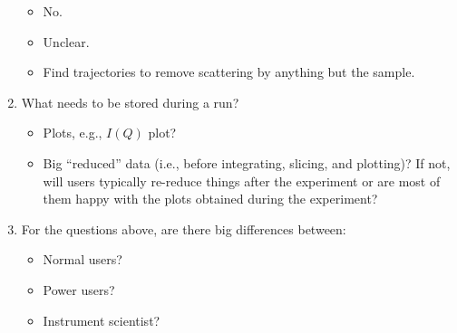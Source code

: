 \documentclass[a4paper,english,numbers=noenddot,bibliography=totoc,chapterprefix=on,DIV=12]{scrartcl}
\begin{document}
\begin{enumerate}
{    \begin{itemize}
      \item No.
      \item Unclear.
      \item Find trajectories to remove scattering by anything but the sample.
    \end{itemize}
  }
  \item What needs to be stored during a run?
    \begin{itemize}
      \item Plots, e.g., $I(Q)$ plot?
      \item Big ``reduced'' data (i.e., before integrating, slicing, and plotting)?
        {\color{black!60}
        If not, will users typically re-reduce things after the experiment or are most of them happy with the plots obtained during the experiment?
        }
    \end{itemize}
  \item For the questions above, are there big differences between:
    \begin{itemize}
      \item Normal users?
      \item Power users?
      \item Instrument scientist?
    \end{itemize}
\end{enumerate}
\end{document}
